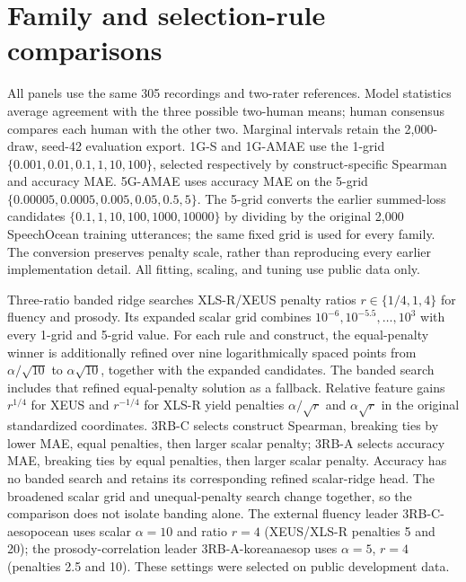 \documentclass[10pt]{article}
\begin{document}
\appendix
\section{Family and selection-rule comparisons}\label{sec:fulltables}\label{sec:selectionrules}
All panels use the same 305 recordings and two-rater references. Model statistics average agreement with the three possible two-human means; human consensus compares each human with the other two. Marginal intervals retain the 2,000-draw, seed-42 evaluation export. 1G-S and 1G-AMAE use the 1-grid $\{0.001,0.01,0.1,1,10,100\}$, selected respectively by construct-specific Spearman and accuracy MAE. 5G-AMAE uses accuracy MAE on the 5-grid $\{0.00005,0.0005,0.005,0.05,0.5,5\}$. The 5-grid converts the earlier summed-loss candidates $\{0.1,\allowbreak1,\allowbreak10,\allowbreak100,\allowbreak1000,\allowbreak10000\}$ by dividing by the original 2,000 SpeechOcean training utterances; the same fixed grid is used for every family. The conversion preserves penalty scale, rather than reproducing every earlier implementation detail. All fitting, scaling, and tuning use public data only.

Three-ratio banded ridge searches XLS-R/XEUS penalty ratios $r\in\{1/4,1,4\}$ for fluency and prosody. Its expanded scalar grid combines $10^{-6},10^{-5.5},\ldots,10^3$ with every 1-grid and 5-grid value. For each rule and construct, the equal-penalty winner is additionally refined over nine logarithmically spaced points from $\alpha/\sqrt{10}$ to $\alpha\sqrt{10}$, together with the expanded candidates. The banded search includes that refined equal-penalty solution as a fallback. Relative feature gains $r^{1/4}$ for XEUS and $r^{-1/4}$ for XLS-R yield penalties $\alpha/\sqrt r$ and $\alpha\sqrt r$ in the original standardized coordinates. 3RB-C selects construct Spearman, breaking ties by lower MAE, equal penalties, then larger scalar penalty; 3RB-A selects accuracy MAE, breaking ties by equal penalties, then larger scalar penalty. Accuracy has no banded search and retains its corresponding refined scalar-ridge head. The broadened scalar grid and unequal-penalty search change together, so the comparison does not isolate banding alone. The external fluency leader 3RB-C-aesopocean uses scalar $\alpha=10$ and ratio $r=4$ (XEUS/XLS-R penalties 5 and 20); the prosody-correlation leader 3RB-A-koreanaesop uses $\alpha=5$, $r=4$ (penalties 2.5 and 10). These settings were selected on public development data.
\end{document}
